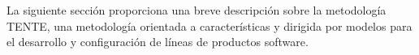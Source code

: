 





La siguiente sección proporciona una breve descripción sobre la metodología TENTE, una metodología orientada a características y dirigida por modelos para el desarrollo y configuración de líneas de productos software.
